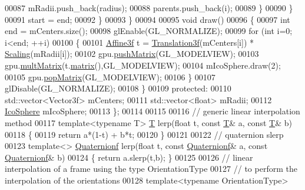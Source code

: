 \begin{DoxyCode}
00087             mRadii.push\_back(radius);
00088             parents.push\_back(i);
00089           \}
00090         \}
00091         start = end;
00092       \}
00093     \}
00094 
00095     \textcolor{keywordtype}{void} draw()
00096     \{
00097       \textcolor{keywordtype}{int} end = mCenters.size();
00098       glEnable(GL\_NORMALIZE);
00099       \textcolor{keywordflow}{for} (\textcolor{keywordtype}{int} i=0; i<end; ++i)
00100       \{
00101         \hyperlink{group___geometry___module_class_eigen_1_1_transform}{Affine3f} t = \hyperlink{group___geometry___module_class_eigen_1_1_translation}{Translation3f}(mCenters[i]) * \hyperlink{group___geometry___module_ga23a8ed57e3f2973526026765ae697761}{Scaling}(mRadii[i]);
00102         gpu.\hyperlink{class_gpu_helper_ac51c8b669a80ca6e4338c87136fb991e}{pushMatrix}(GL\_MODELVIEW);
00103         gpu.\hyperlink{class_gpu_helper_a3abb45392e7dcf6450fa94bd345d9096}{multMatrix}(t.\hyperlink{group___geometry___module_aec8168000a88a807130d41020af98d47}{matrix}(),GL\_MODELVIEW);
00104         mIcoSphere.draw(2);
00105         gpu.\hyperlink{class_gpu_helper_aad0cc23c2eaf0dcc610b180e5c8b195e}{popMatrix}(GL\_MODELVIEW);
00106       \}
00107       glDisable(GL\_NORMALIZE);
00108     \}
00109   \textcolor{keyword}{protected}:
00110     std::vector<Vector3f> mCenters;
00111     std::vector<float> mRadii;
00112     \hyperlink{class_ico_sphere}{IcoSphere} mIcoSphere;
00113 \};
00114 
00115 
00116 \textcolor{comment}{// generic linear interpolation method}
00117 \textcolor{keyword}{template}<\textcolor{keyword}{typename} T> \hyperlink{group___sparse_core___module}{T} lerp(\textcolor{keywordtype}{float} t, \textcolor{keyword}{const} \hyperlink{group___sparse_core___module}{T}& a, \textcolor{keyword}{const} \hyperlink{group___sparse_core___module}{T}& b)
00118 \{
00119   \textcolor{keywordflow}{return} a*(1-t) + b*t;
00120 \}
00121 
00122 \textcolor{comment}{// quaternion slerp}
00123 \textcolor{keyword}{template}<> \hyperlink{group___geometry___module_class_eigen_1_1_quaternion}{Quaternionf} lerp(\textcolor{keywordtype}{float} t, \textcolor{keyword}{const} \hyperlink{group___geometry___module_class_eigen_1_1_quaternion}{Quaternionf}& a, \textcolor{keyword}{const} 
      \hyperlink{group___geometry___module_class_eigen_1_1_quaternion}{Quaternionf}& b)
00124 \{ \textcolor{keywordflow}{return} a.slerp(t,b); \}
00125 
00126 \textcolor{comment}{// linear interpolation of a frame using the type OrientationType}
00127 \textcolor{comment}{// to perform the interpolation of the orientations}
00128 \textcolor{keyword}{template}<\textcolor{keyword}{typename} OrientationType>

\end{DoxyCode}
